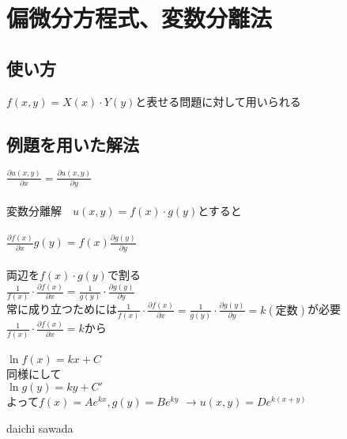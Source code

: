 \documentclass[titlepage,dvipdfmx]{jsarticle}
\begin{document}
\section{偏微分方程式、変数分離法}
\subsection*{使い方}
$f(x,y)=X(x)\cdot Y(y)$と表せる問題に対して用いられる
\subsection*{例題を用いた解法}
$\displaystyle \frac{\partial u(x,y)}{\partial x}=\frac{\partial u(x,y)}{\partial y}$\\ \\
変数分離解　$u(x,y)=f(x)\cdot g(y)$とすると\\\\
$\displaystyle \frac{\partial f(x)}{\partial x}g(y)=f(x)\frac{\partial g(y)}{\partial y}$\\ \\
両辺を$f(x)\cdot g(y)$で割る\\

$\displaystyle \frac{1}{f(x)}\cdot \frac{\partial f(x)}{\partial x}=\frac{1}{g(y)}\cdot \frac{\partial g(y)}{\partial y}$\\
常に成り立つためには$\displaystyle \frac{1}{f(x)}\cdot \frac{\partial f(x)}{\partial x}=\frac{1}{g(y)}\cdot \frac{\partial g(y)}{\partial y}=k(定数)$が必要\\
$\displaystyle \frac{1}{f(x)}\cdot \frac{\partial f(x)}{\partial x}=k$から\\\\
$\displaystyle \ln f(x) =kx+C$\\
同様にして\\
$\displaystyle \ln g(y) =ky+C'$\\
よって$f(x)=Ae^{kx},g(y)=Be^{ky}$
$\rightarrow u(x,y)=De^{k(x+y)}$

daichi sawada
\end{document}
